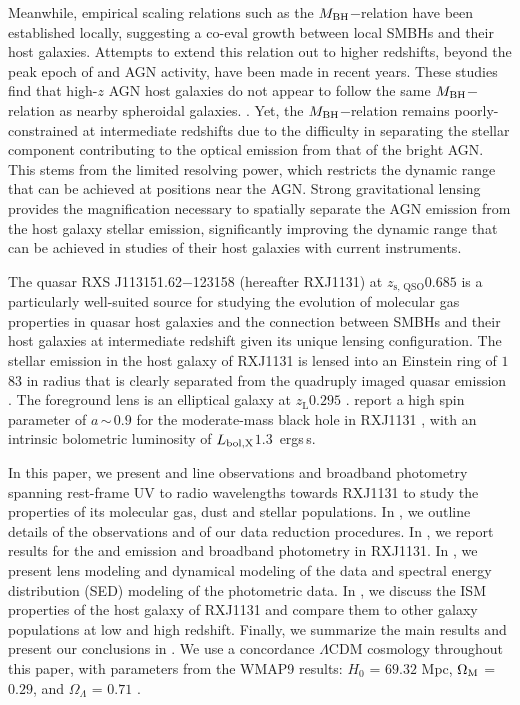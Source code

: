 \documentclass[]{emulateapj}
\begin{document}
Meanwhile, empirical scaling relations such as the
$M_{\rm BH}$$-$\mbulge relation \citep[e.g.,][]{Magorrian98a, HR04a}
have been established locally, suggesting a co-eval growth between local SMBHs and their host galaxies.
Attempts to extend this relation out to higher redshifts, beyond the peak epoch
of \SF and AGN activity, have been made in recent years.
These studies find that
high-$z$ AGN host galaxies do not appear to follow the same $M_{\rm BH}$$-$\mbulge relation as nearby spheroidal galaxies. \citep[\eg][]{Walter04a,Borys05a, McLure06a,Peng06a, Riechers08a,Coppin08a,Alexander08a}.
Yet, the $M_{\rm BH}$$-$\mbulge relation remains poorly-constrained
at intermediate redshifts due to the difficulty
in separating the stellar component contributing to the optical emission from that of the bright AGN.
This stems from the limited resolving power, which restricts the dynamic range that can be achieved at positions near the AGN.
Strong gravitational lensing provides the magnification necessary to spatially separate the AGN emission from the host galaxy stellar emission, significantly improving the dynamic range that can be achieved in studies of their host galaxies with current instruments.


The quasar RXS J113151.62$-$123158 (hereafter RXJ1131)
at $z_\textrm{s, QSO}$\eq$0.685$ \citep[hereafter S03]{Sluse03a} is a particularly well-suited source for
studying the evolution of molecular gas properties in quasar host galaxies and the
connection between SMBHs and their host galaxies at intermediate redshift
given its unique lensing configuration.
The stellar emission in the host galaxy of RXJ1131 is lensed into
an Einstein ring of $1$\farcs$83$ in radius
that is clearly separated from the quadruply imaged quasar emission \citep[hereafter C06]{Claeskens06a}.
The foreground lens is an elliptical galaxy at $z_\textrm{L}$\eq$0.295$ .
\citet[][]{Reis14a} report a high spin parameter of $a$\,$\sim$\,$0.9$ for the moderate-mass black hole in RXJ1131 \citep[$M_{\rm BH}$\eq$8$\Msun;][]{Sluse12a},
with an intrinsic bolometric luminosity of $L_{\rm bol, X}$\eq$1.3$\, ergs\,s\pmOne \citep{Pooley07a}.

In this paper, we present \bco and \cco line observations and
broadband photometry spanning rest-frame UV to radio wavelengths towards RXJ1131 to
study the properties of its molecular gas, dust and stellar populations.
In , we outline details of the observations and of our data reduction procedures.
In , we report results for the \bco and \cco emission and broadband
photometry in RXJ1131.
In , we present lens modeling and dynamical modeling of the \bco data and
spectral energy distribution (SED) modeling of the photometric data.
In , we discuss
the ISM properties of the host galaxy of RXJ1131 and compare
them to other galaxy populations at low and high redshift.
Finally, we summarize the main results and present our conclusions in .
We use a concordance $\Lambda$CDM cosmology throughout this paper, with
parameters from the WMAP9 results:
$H_0$ = $69.32$ \kms Mpc\pmOne, $\Omega_{\rm M}$ = $0.29$, and
$\Omega_{\Lambda}$ = $0.71$ \citep{Hinshaw13a}.
\end{document}
